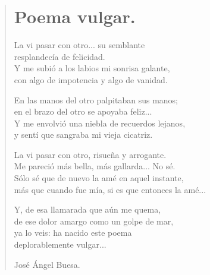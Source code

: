 \documentclass[11pt, portrait, twoside, notitlepage, openright]{book}
\begin{document}
\newpage
\begin{verse}
\begin{center}
\section{Poema vulgar.}
\end{center}
La vi pasar con otro... su semblante\\
resplandecía de felicidad.\\
Y me subió a los labios mi sonrisa galante,\\
con algo de impotencia y algo de vanidad.
\newline

En las manos del otro palpitaban sus manos;\\
en el brazo del otro se apoyaba feliz...\\
Y me envolvió una niebla de recuerdos lejanos,\\
y sentí que sangraba mi vieja cicatriz.
\newline

La vi pasar con otro, risueña y arrogante.\\
Me pareció más bella, más gallarda... No sé.\\
Sólo sé que de nuevo la amé en aquel instante,\\
más que cuando fue mía, si es que entonces la amé...
\newline

Y, de esa llamarada que aún me quema,\\
de ese dolor amargo como un golpe de mar,\\
ya lo veis: ha nacido este poema\\
deplorablemente vulgar...
\newline

José Ángel Buesa.
\end{verse}
\end{document}
